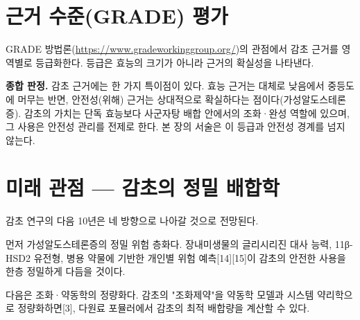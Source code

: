 \documentclass[12pt,oneside]{book}
\begin{document}
\section{근거 수준(GRADE) 평가}

GRADE 방법론(\url{https://www.gradeworkinggroup.org/})의 관점에서 감초 근거를 영역별로 등급화한다. 등급은 효능의 크기가 아니라 근거의 확실성을 나타낸다.

\vspace{2pt}\vspace{3pt}

\textbf{종합 판정.} 감초 근거에는 한 가지 특이점이 있다. 효능 근거는 대체로 낮음에서 중등도에 머무는 반면, 안전성(위해) 근거는 상대적으로 확실하다는 점이다(가성알도스테론증). 감초의 가치는 단독 효능보다 사군자탕 배합 안에서의 조화·완성 역할에 있으며, 그 사용은 안전성 관리를 전제로 한다. 본 장의 서술은 이 등급과 안전성 경계를 넘지 않는다.

\section{미래 관점 — 감초의 정밀 배합학}

감초 연구의 다음 10년은 네 방향으로 나아갈 것으로 전망된다.

먼저 가성알도스테론증의 정밀 위험 층화다. 장내미생물의 글리시리진 대사 능력, 11β-HSD2 유전형, 병용 약물에 기반한 개인별 위험 예측[14][15]이 감초의 안전한 사용을 한층 정밀하게 다듬을 것이다.

다음은 조화·약동학의 정량화다. 감초의 "조화제약"을 약동학 모델과 시스템 약리학으로 정량화하면[3], 다원료 포뮬러에서 감초의 최적 배합량을 계산할 수 있다.
\end{document}
